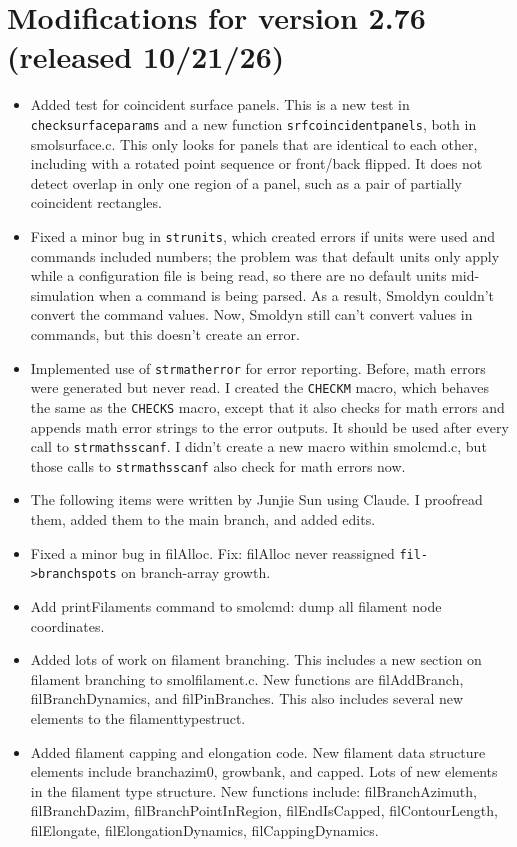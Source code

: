 \documentclass {scrbook}
\newcommand {\ttt} {\texttt}
\begin{document}
\section{Modifications for version 2.76 (released 10/21/26)}
\begin{itemize}
\item Added test for coincident surface panels. This is a new test in \ttt{checksurfaceparams} and a new function \ttt{srfcoincidentpanels}, both in smolsurface.c. This only looks for panels that are identical to each other, including with a rotated point sequence or front/back flipped. It does not detect overlap in only one region of a panel, such as a pair of partially coincident rectangles.
\item Fixed a minor bug in \ttt{strunits}, which created errors if units were used and commands included numbers; the problem was that default units only apply while a configuration file is being read, so there are no default units mid-simulation when a command is being parsed. As a result, Smoldyn couldn't convert the command values. Now, Smoldyn still can't convert values in commands, but this doesn't create an error.
\item Implemented use of \ttt{strmatherror} for error reporting. Before, math errors were generated but never read. I created the \ttt{CHECKM} macro, which behaves the same as the \ttt{CHECKS} macro, except that it also checks for math errors and appends math error strings to the error outputs. It should be used after every call to \ttt{strmathsscanf}. I didn't create a new macro within smolcmd.c, but those calls to \ttt{strmathsscanf} also check for math errors now.
\item The following items were written by Junjie Sun using Claude. I proofread them, added them to the main branch, and added edits.
\item Fixed a minor bug in filAlloc. Fix: filAlloc never reassigned \ttt{fil->branchspots} on branch-array growth.
\item Add printFilaments command to smolcmd: dump all filament node coordinates.
\item Added lots of work on filament branching. This includes a new section on filament branching to smolfilament.c. New functions are filAddBranch, filBranchDynamics, and filPinBranches. This also includes several new elements to the filamenttypestruct.
\item Added filament capping and elongation code. New filament data structure elements include branchazim0, growbank, and capped. Lots of new elements in the filament type structure. New functions include: filBranchAzimuth, filBranchDazim, filBranchPointInRegion, filEndIsCapped, filContourLength, filElongate, filElongationDynamics, filCappingDynamics.

\end{itemize}
\end{document}
